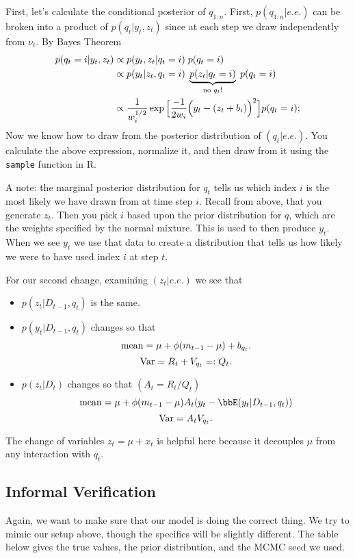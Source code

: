\documentclass{article}
\begin{document}
First, let's calculate the conditional posterior of $q_{1:n}$.  First, $p(q_{1:n}|e.e.)$ can be broken into a product of $p(q_t|y_t,z_t)$ since at each step we draw independently from $\nu_t$.  By Bayes Theorem
\begin{align*}
p(q_t = i | y_t, z_t) 
& \propto p(y_t, z_t | q_t = i) \; p(q_t = i) \\
& \propto p(y_t | z_t, q_t = i) \; \underbrace{p(z_t | q_t = i)}_{\textmd{no $q_t$!}} \; p(q_t = i) \\
& \propto \frac{1}{w_i^{1/2}} \exp \Big[ \frac{-1}{2 w_i} \Big( y_t - (z_t + b_i) \Big)^2 \Big] p(q_t = i);
\end{align*}
Now we know how to draw from the posterior distribution of $(q_t | e.e.)$.  You calculate the above expression, normalize it, and then draw from it using the \texttt{sample} function in R.

A note: the marginal posterior distribution for $q_t$ tells us which index $i$ is the most likely we have drawn from at time step $i$.  Recall from above, that you generate $z_t$.  Then you pick $i$ based upon the prior distribution for $q$, which are the weights specified by the normal mixture.  This is used to then produce $y_t$.  When we see $y_t$ we use that data to create a distribution that tells us how likely we were to have used index $i$ at step $t$.

For our second change, examining $(z_t | e.e.)$ we see that
\begin{itemize}
\item $p(z_t | D_{t-1}, q_t)$ is the same.
\item $p(y_t | D_{t-1}, q_t)$ changes so that
\[
\textmd{mean} = \mu + \phi (m_{t-1} - \mu) + b_{q_t}.
\]
\[
\textmd{Var} = R_t + V_{q_t} =: Q_t.
\]
\item $p(z_t | D_t)$ changes so that $(A_t = R_t/Q_t)$
\[
\textmd{mean} = \mu + \phi (m_{t-1} - \mu) A_t (y_t - \bbE(y_t | D_{t-1},q_t))
\]
\[
\textmd{Var} = A_t V_{q_t}.
\]
\end{itemize}
The change of variables $z_t = \mu + x_t$ is helpful here because it decouples $\mu$ from any interaction with $q_t$.

\subsection{Informal Verification}

Again, we want to make sure that our model is doing the correct thing.  We try to mimic our setup above, though the specifics will be slightly different.  The table below gives the true values, the prior distribution, and the MCMC seed we used.
\end{document}
